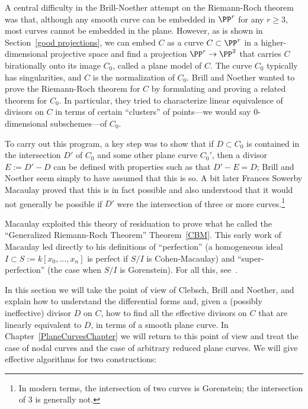 A central difficulty in the Brill-Noether attempt on the Riemann-Roch theorem was that,
although any smooth curve can be embedded in $\PP^r$ for any $r \geq 3$, most curves cannot be embedded in the plane. 
However, as is shown in Section~\ref{good projections}, we can embed $C$ as a curve $ C \subset \PP^r$ in a higher-dimensional projective space and find a projection $\PP^r \to \PP^2$ that carries $C$ birationally onto its image $C_0$, called a plane model of $C$. The curve $C_0$ typically has singularities, and $C$ is the normalization of $C_0$. Brill and Noether wanted to prove the Riemann-Roch theorem for $C$ by formulating and proving a related theorem for $C_0$. In particular, they tried to characterize linear equivalence of divisors on $C$ in terms of certain ``clusters'' of points---we would say 0-dimensional subschemes---of $C_0$. 

To carry out this program, a key step was to show that if $D\subset C_0$ is contained in the intersection
$D'$ of $C_0$ and some other plane curve $C_0'$, then a divisor 
$E := D'-D$ can be defined with properties such as that $D'-E = D$; Brill and Noether seem simply to have assumed that this is so. A bit later Frances Sowerby Macaulay proved that this is in fact possible  and also understood that it would not generally be possible if $D'$ were the intersection of three or more curves.\footnote{In modern terms, the intersection of two curves is Gorenstein; the intersection of 3 is generally not.}

Macaulay exploited this theory of residuation  to prove what he called the ``Generalized Riemann-Roch Theorem'' Theorem~\ref{CBM}. This early work of Macaulay led directly to his definitions of  ``perfection'' (a homogeneous ideal
$I  \subset S:= k[x_0, \dots, x_n]$ is perfect if $S/I$ is Cohen-Macaulay) and ``super-perfection'' (the case when $S/I$ is
Gorenstein). For all this, see~\cite{Threads}.

In this section we will take the point of view of Clebsch, Brill and Noether, and explain how to understand 
the differential forms and, given a (possibly ineffective) divisor $D$ on $C$, how to find all the 
effective divisors on $C$ that are linearly equivalent to $D$, in terms of a smooth plane curve. In Chapter~\ref{PlaneCurvesChapter} we will return to this point of view and treat the case of
nodal curves and the case of arbitrary reduced plane curves. We will give effective algorithms for
two constructions:

